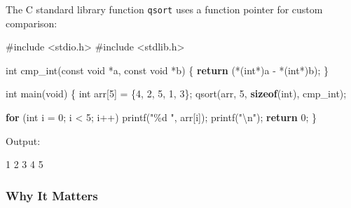 \documentclass[
  letterpaper,
  DIV=11,
  numbers=noendperiod]{scrreprt}
\newenvironment{Shaded}{\begin{snugshade}}{\end{snugshade}}
\newcommand{\ControlFlowTok}[1]{\textcolor[rgb]{0.00,0.23,0.31}{\textbf{#1}}}
\newcommand{\DataTypeTok}[1]{\textcolor[rgb]{0.68,0.00,0.00}{#1}}
\newcommand{\DecValTok}[1]{\textcolor[rgb]{0.68,0.00,0.00}{#1}}
\newcommand{\ExtensionTok}[1]{\textcolor[rgb]{0.00,0.23,0.31}{#1}}
\newcommand{\ImportTok}[1]{\textcolor[rgb]{0.00,0.46,0.62}{#1}}
\newcommand{\KeywordTok}[1]{\textcolor[rgb]{0.00,0.23,0.31}{\textbf{#1}}}
\newcommand{\NormalTok}[1]{\textcolor[rgb]{0.00,0.23,0.31}{#1}}
\newcommand{\OperatorTok}[1]{\textcolor[rgb]{0.37,0.37,0.37}{#1}}
\newcommand{\PreprocessorTok}[1]{\textcolor[rgb]{0.68,0.00,0.00}{#1}}
\newcommand{\SpecialCharTok}[1]{\textcolor[rgb]{0.37,0.37,0.37}{#1}}
\newcommand{\StringTok}[1]{\textcolor[rgb]{0.13,0.47,0.30}{#1}}
\begin{document}
The C standard library function \texttt{qsort} uses a function pointer
for custom comparison:

\begin{Shaded}
\begin{Highlighting}[]
\PreprocessorTok{\#include }\ImportTok{\textless{}stdio.h\textgreater{}}
\PreprocessorTok{\#include }\ImportTok{\textless{}stdlib.h\textgreater{}}

\DataTypeTok{int}\NormalTok{ cmp\_int}\OperatorTok{(}\DataTypeTok{const} \DataTypeTok{void} \OperatorTok{*}\NormalTok{a}\OperatorTok{,} \DataTypeTok{const} \DataTypeTok{void} \OperatorTok{*}\NormalTok{b}\OperatorTok{)} \OperatorTok{\{}
    \ControlFlowTok{return} \OperatorTok{(*(}\DataTypeTok{int}\OperatorTok{*)}\NormalTok{a }\OperatorTok{{-}} \OperatorTok{*(}\DataTypeTok{int}\OperatorTok{*)}\NormalTok{b}\OperatorTok{);}
\OperatorTok{\}}

\DataTypeTok{int}\NormalTok{ main}\OperatorTok{(}\DataTypeTok{void}\OperatorTok{)} \OperatorTok{\{}
    \DataTypeTok{int}\NormalTok{ arr}\OperatorTok{[}\DecValTok{5}\OperatorTok{]} \OperatorTok{=} \OperatorTok{\{}\DecValTok{4}\OperatorTok{,} \DecValTok{2}\OperatorTok{,} \DecValTok{5}\OperatorTok{,} \DecValTok{1}\OperatorTok{,} \DecValTok{3}\OperatorTok{\};}
\NormalTok{    qsort}\OperatorTok{(}\NormalTok{arr}\OperatorTok{,} \DecValTok{5}\OperatorTok{,} \KeywordTok{sizeof}\OperatorTok{(}\DataTypeTok{int}\OperatorTok{),}\NormalTok{ cmp\_int}\OperatorTok{);}

    \ControlFlowTok{for} \OperatorTok{(}\DataTypeTok{int}\NormalTok{ i }\OperatorTok{=} \DecValTok{0}\OperatorTok{;}\NormalTok{ i }\OperatorTok{\textless{}} \DecValTok{5}\OperatorTok{;}\NormalTok{ i}\OperatorTok{++)}\NormalTok{ printf}\OperatorTok{(}\StringTok{"}\SpecialCharTok{\%d}\StringTok{ "}\OperatorTok{,}\NormalTok{ arr}\OperatorTok{[}\NormalTok{i}\OperatorTok{]);}
\NormalTok{    printf}\OperatorTok{(}\StringTok{"}\SpecialCharTok{\textbackslash{}n}\StringTok{"}\OperatorTok{);}
    \ControlFlowTok{return} \DecValTok{0}\OperatorTok{;}
\OperatorTok{\}}
\end{Highlighting}
\end{Shaded}

Output:

\begin{Shaded}
\begin{Highlighting}[]
\ExtensionTok{1}\NormalTok{ 2 3 4 5}
\end{Highlighting}
\end{Shaded}

\subsubsection{Why It Matters}\label{why-it-matters-32}
\end{document}
